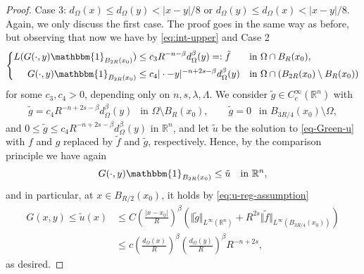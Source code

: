 \documentclass[10pt,a4paper]{amsart}
\newcommand{\R}{\mathbb{R}}
\begin{document}
\begin{proof}
Case 3: $d_{\Omega}(x) \le d_{\Omega}(y) < |x-y|/8$ or $d_{\Omega}(y) \le d_{\Omega}(x) < |x-y|/8$. Again, we only discuss the first case. The proof goes in the same way as before, but observing that now we have by \eqref{eq:int-upper} and Case 2
\begin{align*}
\left\{
\begin{aligned}
L(G(\cdot,y)\mathbbm{1}_{B_{2R}(x_0)}) &\le c_3 R^{-n-\beta} d_{\Omega}^{\beta}(y) =:\tilde{f} &&\text{in } \Omega \cap B_{R}(x_0), \\
G(\cdot,y)\mathbbm{1}_{B_{2R}(x_0)} &\le c_4 |\cdot-y|^{-n+2s-\beta} d_{\Omega}^{\beta}(y) &&\text{in } \Omega \cap (B_{2R}(x_0) \setminus B_{R}(x_0))
\end{aligned}
\right.
\end{align*}
for some $c_3, c_4 > 0$, depending only on $n,s,\lambda,\Lambda$. We consider $\tilde{g} \in C_c^{\infty}(\R^n)$ with
\begin{align*}
        \tilde{g} = c_4 R^{-n+2s-\beta}d_{\Omega}^{\beta}(y) ~~ \text{ in } \Omega \setminus B_R(x_0), \qquad \tilde{g} = 0~~ \text{ in } B_{3R/4}(x_0) \setminus \Omega,
\end{align*}
and $0 \le \tilde{g} \le c_4 R^{-n+2s-\beta} d_{\Omega}^{\beta}(y)$ in $\R^n$, and let $\tilde{u}$ be the solution to \eqref{eq-Green-u} with $f$ and $g$ replaced by $\tilde{f}$ and $\tilde{g}$, respectively. Hence, by the comparison principle we have again 
\begin{align*}
G(\cdot,y)\mathbbm{1}_{B_{2R}(x_0)} \le \tilde{u} ~~ \text{ in } \R^n,
\end{align*}
and in particular, at $x \in B_{R/2}(x_0)$, it holds by \eqref{eq:u-reg-assumption}
\begin{align*}
G(x,y) \le \tilde{u}(x)
&\le C \left( \frac{|x-x_0|}{R} \right)^{\beta} \left( \Vert \tilde{g} \Vert_{L^{\infty}(\R^n)} + R^{2s} \Vert \tilde{f} \Vert_{L^{\infty}(B_{3R/4}(x_0))} \right) \\
&\le c \left( \frac{d_\Omega(x)}{R} \right)^\beta \left( \frac{d_\Omega(y)}{R} \right)^\beta R^{-n+2s},
\end{align*}
as desired.
\end{proof}
\end{document}
